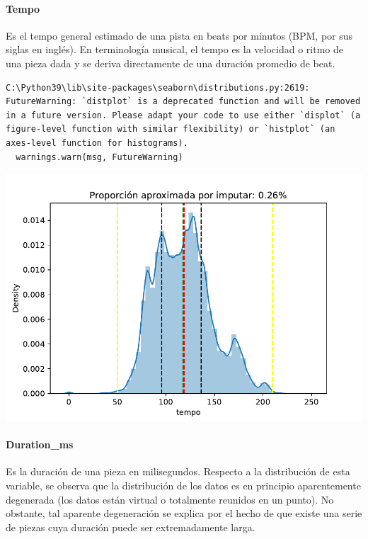 \documentclass[
  letterpaper,
  DIV=11,
  numbers=noendperiod]{scrartcl}
\let\oldparagraph\paragraph
\renewcommand{\paragraph}[1]{\oldparagraph{#1}\mbox{}}
\begin{document}
\hypertarget{tempo}{%
\paragraph{Tempo}\label{tempo}}

Es el tempo general estimado de una pista en beats por minutos (BPM, por
sus siglas en inglés). En terminología musical, el tempo es la velocidad
o ritmo de una pieza dada y se deriva directamente de una duración
promedio de beat.

\begin{verbatim}
C:\Python39\lib\site-packages\seaborn\distributions.py:2619: FutureWarning: `distplot` is a deprecated function and will be removed in a future version. Please adapt your code to use either `displot` (a figure-level function with similar flexibility) or `histplot` (an axes-level function for histograms).
  warnings.warn(msg, FutureWarning)
\end{verbatim}

\includegraphics{informe_01_files/figure-pdf/unnamed-chunk-18-9.pdf}

\hypertarget{duration_ms}{%
\paragraph{Duration\_ms}\label{duration_ms}}

Es la duración de una pieza en milisegundos. Respecto a la distribución
de esta variable, se observa que la distribución de los datos es en
principio aparentemente degenerada (los datos están virtual o totalmente
reunidos en un punto). No obstante, tal aparente degeneración se explica
por el hecho de que existe una serie de piezas cuya duración puede ser
extremadamente larga.
\end{document}
